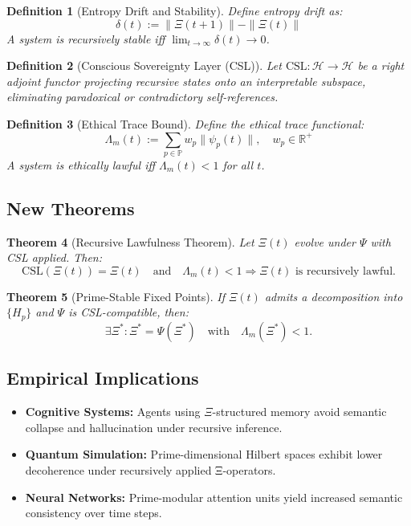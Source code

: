 \documentclass[12]{amsart}
\theoremstyle{plain}
\newtheorem{theorem}{Theorem}[section]
\newtheorem{definition}[theorem]{Definition}
\begin{document}
\begin{definition}[Entropy Drift and Stability]
Define entropy drift as:
\[
\delta(t) := \| \Xi(t+1) \| - \| \Xi(t) \|
\]
A system is recursively stable iff $\lim_{t \to \infty} \delta(t) \to 0$.
\end{definition}

\begin{definition}[Conscious Sovereignty Layer (CSL)]
Let $\mathrm{CSL} : \mathcal{H} \to \mathcal{H}$ be a right adjoint functor projecting recursive states onto an interpretable subspace, eliminating paradoxical or contradictory self-references.
\end{definition}

\begin{definition}[Ethical Trace Bound]
Define the ethical trace functional:
\[
\Lambda_m(t) := \sum_{p \in \mathbb{P}} w_p \| \psi_p(t) \|, \quad w_p \in \mathbb{R}^+
\]
A system is ethically lawful iff $\Lambda_m(t) < 1$ for all $t$.
\end{definition}

\subsection{New Theorems}

\begin{theorem}[Recursive Lawfulness Theorem]
Let $\Xi(t)$ evolve under $\Psi$ with CSL applied. Then:
\[
\text{CSL}(\Xi(t)) = \Xi(t) \quad \text{and} \quad \Lambda_m(t) < 1 \Rightarrow \Xi(t) \text{ is recursively lawful}.
\]
\end{theorem}

\begin{theorem}[Prime-Stable Fixed Points]
If $\Xi(t)$ admits a decomposition into $\{H_p\}$ and $\Psi$ is CSL-compatible, then:
\[
\exists \Xi^* : \Xi^* = \Psi(\Xi^*) \quad \text{with} \quad \Lambda_m(\Xi^*) < 1.
\]
\end{theorem}

\subsection{Empirical Implications}

\begin{itemize}
  \item \textbf{Cognitive Systems:} Agents using $\Xi$-structured memory avoid semantic collapse and hallucination under recursive inference.
  \item \textbf{Quantum Simulation:} Prime-dimensional Hilbert spaces exhibit lower decoherence under recursively applied Ξ-operators.
  \item \textbf{Neural Networks:} Prime-modular attention units yield increased semantic consistency over time steps.
\end{itemize}
\end{document}
